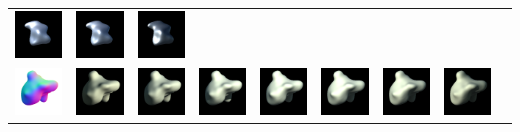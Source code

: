 \begin{center}
\begin{longtable}{@{}c@{}c@{}c@{}c@{}c@{}c@{}c@{}c@{}c@{}}
\includegraphics[width=0.1\linewidth]{training/29_5.png} & \includegraphics[width=0.1\linewidth]{training/29_6.png} &
\includegraphics[width=0.1\linewidth]{training/29_7.png} \\
\includegraphics[width=0.1\linewidth]{training/30_gt.png} & \includegraphics[width=0.1\linewidth]{training/30_0.png} &
\includegraphics[width=0.1\linewidth]{training/30_1.png} & \includegraphics[width=0.1\linewidth]{training/30_2.png} &
\includegraphics[width=0.1\linewidth]{training/30_3.png} & \includegraphics[width=0.1\linewidth]{training/30_4.png} &
\includegraphics[width=0.1\linewidth]{training/30_5.png} & \includegraphics[width=0.1\linewidth]{training/30_6.png} &

\end{longtable}
\end{center}
